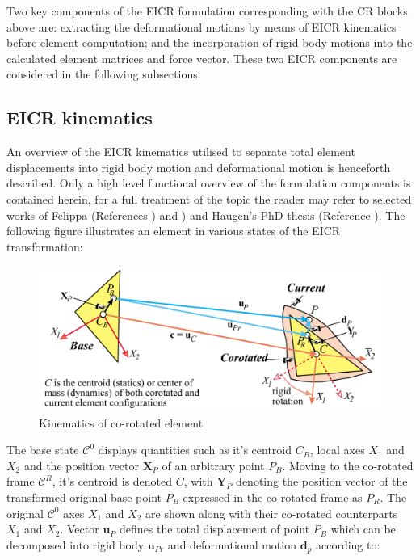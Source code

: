 Two key components of the EICR formulation corresponding with the CR blocks above are: extracting the deformational motions by means of EICR kinematics before element computation; and the incorporation of rigid body motions into the calculated element matrices and force vector. These two EICR components are considered in the following subsections.

\subsection{EICR kinematics}
An overview of the EICR kinematics utilised to separate total element displacements into rigid body motion and deformational motion is henceforth described. Only a high level functional overview of the formulation components is contained herein, for a full treatment of the topic the reader may refer to selected works of Felippa (References \cite{FelippaCR1_2016}) and \cite{felippa2000systematic}) and Haugen's PhD thesis (Reference \cite{Hau94}). The following figure illustrates an element in various states of the EICR transformation:

\begin{figure}[H]
	\centering
	\def\svgwidth{\columnwidth}
	\includegraphics[width=14cm]{images/cr_4.png}
	\caption{Kinematics of co-rotated element \cite{felippa2000systematic}}
	\label{cr4}
\end{figure}

The base state $\mathscr{C}^0$ displays quantities such as it's centroid $C_B$, local axes $X_1$ and $X_2$ and the position vector $\mathbf{X}_P$ of an arbitrary point $P_B$. Moving to the co-rotated frame $\mathscr{C}^R$, it's centroid is denoted $C$, with $\mathbf{Y}_P$ denoting the position vector of the transformed original base point $P_B$ expressed in the co-rotated frame as $P_R$. The original $\mathscr{C}^0$ axes $X_1$ and $X_2$ are shown along with their co-rotated counterparts $\bar{X}_1$ and $\bar{X}_2$. Vector $\mathbf{u}_P$ defines the total displacement of point $P_B$ which can be decomposed into rigid body $\mathbf{u}_{Pr}$ and deformational motion $\mathbf{d}_p$ according to:


